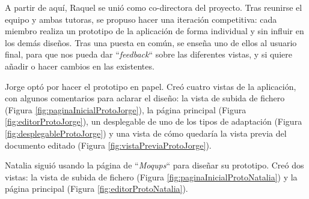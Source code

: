 	
	A partir de aqu\'i, Raquel se uni\'o como co-directora del proyecto. Tras reunirse el equipo y ambas tutoras, se propuso hacer una iteraci\'on competitiva: cada miembro realiza un prototipo de la aplicaci\'on de forma individual y sin influir en los dem\'as dise\~{n}os. Tras una puesta en com\'un, se ense\~{n}a uno de ellos al usuario final, para que nos pueda dar ``\textit{feedback}`` sobre las diferentes vistas, y si quiere a\~{n}adir o hacer cambios en las existentes.

	Jorge opt\'o por hacer el prototipo en papel. Cre\'o cuatro vistas de la aplicaci\'on, con algunos comentarios para aclarar el dise\~{n}o: la vista de subida de fichero (Figura \ref{fig:paginaInicialProtoJorge}), la p\'agina principal (Figura \ref{fig:editorProtoJorge}), un desplegable de uno de los tipos de adaptaci\'on (Figura \ref{fig:desplegableProtoJorge}) y una vista de c\'omo quedar\'ia la vista previa del documento editado (Figura \ref{fig:vistaPreviaProtoJorge}). 

	
	Natalia sigui\'o usando la p\'agina de ``\textit{Moqups}`` para dise\~{n}ar su prototipo. Cre\'o dos vistas: la vista de subida de fichero (Figura \ref{fig:paginaInicialProtoNatalia}) y la p\'agina principal (Figura \ref{fig:editorProtoNatalia}).
	
